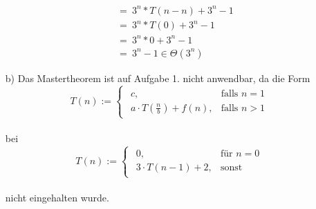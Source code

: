 \documentclass{article}
\begin{document}
\begin{enumerate}
\[\begin{array}{ll}
                &=~3^n*T(n-n)+3^n-1\\
                &=~3^n*T(0)+3^n-1\\
                &=~3^n*0+3^n-1\\
                &=~3^n-1 \in \Theta (3^n)
            \end{array}
        \]
        \item [b)]
        Das Mastertheorem ist auf Aufgabe 1. nicht anwendbar, da die Form\\
        \[
		T(n) :=  \begin{cases}
					\begin{array}{ll}
						c, & \text{falls }n=1\\
						a \cdot T(\frac{n}{b})+f(n), &\text{falls }n>1
					\end{array}
				\end{cases}
    	\]
    	\\
    	bei\\
    	\[
		T(n) :=  \begin{cases}
					\begin{array}{ll}
						0, & \text{für }n=0\\
						3 \cdot T(n-1)+2, &\text{sonst}
					\end{array}
				\end{cases}
    	\]
    	\\
    	nicht eingehalten wurde.
    \end{enumerate}
\end{document}
